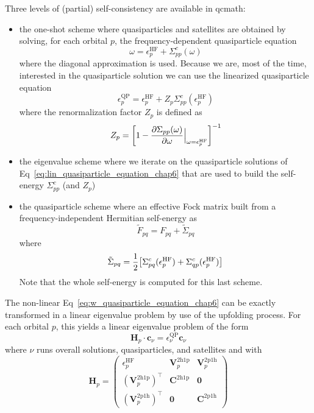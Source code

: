\documentclass[aip,jcp,reprint,noshowkeys,superscriptaddress]{revtex4-1}
\newcommand{\T}[1]{#1^{\intercal}}
\newcommand{\HF}{\text{HF}}
\newcommand{\bH}{\mathbf{H}}
\newcommand{\bc}{\mathbf{c}}
\newcommand{\ep}{\epsilon}
\newcommand{\bV}[2]{\boldsymbol{V}_{#1}^{#2}}
\newcommand{\bCs}[2]{\boldsymbol{C}_{#1}^{#2}}
\newcommand{\bO}{\mathbf{0}}
\newcommand{\eHF}[1]{\epsilon^\text{HF}_{#1}}
\newcommand{\eQP}[1]{\epsilon^\text{QP}_{#1}}
\newcommand{\epss}[2]{\epsilon_{#1}^{#2}}
\newcommand{\Z}[1]{Z_{#1}}
\begin{document}
Three levels of (partial) self-consistency are available in qcmath:
\begin{itemize}
\item the one-shot scheme where quasiparticles and satellites are obtained by solving, for each orbital $p$, the frequency-dependent quasiparticle equation 
\begin{equation}
\label{eq:w_quasiparticle_equation}
\omega = \eHF{p} + \Sigma_{pp}^c(\omega)
\end{equation}
where the diagonal approximation is used. Because we are, most of the time, interested in the quasiparticle solution we can use the linearized quasiparticle equation
\begin{equation}
\label{eq:lin_quasiparticle_equation}
\eQP{p} = \eHF{p} + \Z{p} \Sigma_{pp}^c(\eHF{p})
\end{equation}
where the renormalization factor $\Z{p}$ is defined as 
\begin{equation}
\Z{p}=\qty[ 1-\frac{\partial \Sigma_{pp}(\omega)}{\partial \omega}\Bigr\rvert_{\omega =\eHF{p} } ]^{-1}
\end{equation}
\item the eigenvalue scheme where we iterate on the quasiparticle solutions of Eq~\eqref{eq:lin_quasiparticle_equation_chap6} that are used to build the self-energy $\Sigma_{pp}^c$ (and $\Z{p}$)
\item the quasiparticle scheme where an effective Fock matrix built from a frequency-independent Hermitian self-energy as \cite{Monino_2021}
\begin{equation}
\tilde{F}_{pq}= F_{pq} + \tilde{\Sigma}_{pq}
\end{equation}
where 
\begin{equation}
\tilde{\Sigma}_{pq}=\frac{1}{2}\qty[\Sigma_{pq}^c(\eHF{p}) + \Sigma_{qp}^c(\eHF{p})]
\end{equation}
Note that the whole self-energy is computed for this last scheme.
\end{itemize}
The non-linear Eq~\eqref{eq:w_quasiparticle_equation_chap6} can be exactly transformed in a linear eigenvalue problem by use of the upfolding process\cite{Backhouse_2020a,Bintrim_2021,Monino_2022}. For each orbital $p$, this yields a linear eigenvalue problem of the form
\begin{equation}
	\bH_{p} \cdot \bc_{\nu} = \ep_{\nu}^{\text{QP}} \bc_{\nu}
\end{equation}
where $\nu$ runs overall solutions, quasiparticles, and satellites and with \cite{Tolle_2023}
\begin{equation}
	\bH_{p} = 
	\begin{pmatrix}
		\epss{p}{\HF}		&	\bV{p}{\text{2h1p}}	&	\bV{p}{\text{2p1h}}
		\\
		\T{(\bV{p}{\text{2h1p}})}	&	\bCs{}{\text{2h1p}}			&	\bO
		\\
		\T{(\bV{p}{\text{2p1h}})}	&	\bO				&	\bCs{}{\text{2p1h}}	
	\end{pmatrix}
\end{equation}
\end{document}
